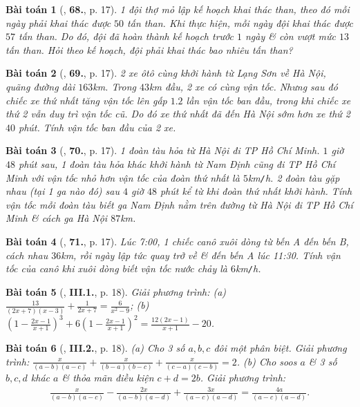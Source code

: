 \documentclass{article}
\numberwithin{equation}{section}
\newtheorem{baitoan}{Bài toán}
\begin{document}
\begin{baitoan}[\cite{SBT_Toan_8_tap_2}, \textbf{68.}, p. 17]
	1 đội thợ mỏ lập kế hoạch khai thác than, theo đó mỗi ngày phải khai thác được $50$ tấn than. Khi thực hiện, mỗi ngày đội khai thác được $57$ tấn than. Do đó, đội đã hoàn thành kế hoạch trước $1$ ngày \& còn vượt mức $13$ tấn than. Hỏi theo kế hoạch, đội phải khai thác bao nhiêu tấn than?
\end{baitoan}

\begin{baitoan}[\cite{SBT_Toan_8_tap_2}, \textbf{69.}, p. 17]
	2 xe ôtô cùng khởi hành từ Lạng Sơn về Hà Nội, quãng đường dài $163$\emph{km}. Trong $43$\emph{km} đầu, 2 xe có cùng vận tốc. Nhưng sau đó chiếc xe thứ nhất tăng vận tốc lên gấp $1.2$ lần vận tốc ban đầu, trong khi chiếc xe thứ 2 vẫn duy trì vận tốc cũ. Do đó xe thứ nhất đã đến Hà Nội sớm hơn xe thứ 2 $40$ phút. Tính vận tốc ban đầu của 2 xe.
\end{baitoan}

\begin{baitoan}[\cite{SBT_Toan_8_tap_2}, \textbf{70.}, p. 17]
	1 đoàn tàu hỏa từ Hà Nội đi TP Hồ Chí Minh. $1$ giờ $48$ phút sau, 1 đoàn tàu hỏa khác khởi hành từ Nam Định cũng đi TP Hồ Chí Minh với vận tốc nhỏ hơn vận tốc của đoàn thứ nhất là $5$\emph{km\texttt{/}h}. 2 đoàn tàu gặp nhau (tại 1 ga nào đó) sau $4$ giờ $48$ phút kể từ khi đoàn thứ nhất khởi hành. Tính vận tốc mỗi đoàn tàu biết ga Nam Định nằm trên đường từ Hà Nội đi TP Hồ Chí Minh \& cách ga Hà Nội $87$\emph{km}.
\end{baitoan}

\begin{baitoan}[\cite{SBT_Toan_8_tap_2}, \textbf{71.}, p. 17]
	Lúc 7:00, 1 chiếc canô xuôi dòng từ bến A đến bến B, cách nhau  $36$\emph{km}, rồi ngày lập tức quay trở về \& đến bến A lúc 11:30. Tính vận tốc của canô khi xuôi dòng biết vận tốc nước chảy là $6$\emph{km\texttt{/}h}.
\end{baitoan}

\begin{baitoan}[\cite{SBT_Toan_8_tap_2}, \textbf{III.1.}, p. 18]
	Giải phương trình: (a) $\frac{13}{(2x + 7)(x - 3)} + \frac{1}{2x + 7} = \frac{6}{x^2 - 9}$; (b) $\left(1 - \frac{2x - 1}{x + 1}\right)^3 + 6\left(1 - \frac{2x - 1}{x + 1}\right)^2 = \frac{12(2x - 1)}{x + 1} - 20$.
\end{baitoan}

\begin{baitoan}[\cite{SBT_Toan_8_tap_2}, \textbf{III.2.}, p. 18]
	(a) Cho 3 số $a,b,c$ đôi một phân biệt. Giải phương trình: $\frac{x}{(a - b)(a - c)} + \frac{x}{(b - a)(b - c)} + \frac{x}{(c - a)(c - b)} = 2$. (b) Cho soos $a$ \& 3 số $b,c,d$ khác $a$ \& thỏa mãn điều kiện $c + d = 2b$. Giải phương trình:
	\begin{align*}
		\frac{x}{(a - b)(a - c)} - \frac{2x}{(a - b)(a - d)} + \frac{3x}{(a - c)(a - d)} = \frac{4a}{(a - c)(a - d)}.
	\end{align*}
\end{baitoan}
\end{document}
